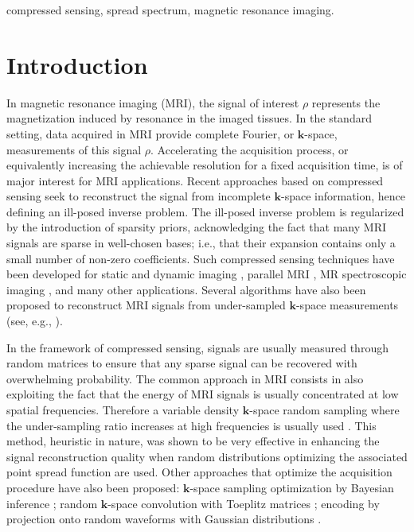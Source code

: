 \documentclass[10pt,draftcls, onecolumn]{IEEEtran}
\begin{document}
\begin{IEEEkeywords}
compressed sensing, spread spectrum, magnetic resonance imaging.
\end{IEEEkeywords}

\section{Introduction}

In magnetic resonance imaging (MRI), the signal of interest $\rho$ represents the magnetization induced by resonance in the imaged tissues. In the standard setting, data acquired in MRI provide complete Fourier, or $\bm{k}$-space, measurements of this signal $\rho$. Accelerating the acquisition process, or equivalently increasing the achievable resolution for a fixed acquisition time, is of major interest for MRI applications. Recent approaches based on compressed sensing seek to reconstruct the signal from incomplete $\bm{k}$-space information, hence defining an ill-posed inverse problem. The ill-posed inverse problem is regularized by the introduction of sparsity priors, acknowledging the fact that many MRI signals are sparse in well-chosen bases; i.e., that their expansion contains only a small number of non-zero coefficients. Such compressed sensing techniques have been developed for static and dynamic imaging \cite{lustig07, jung07, gamper08, jung09, usman11}, parallel MRI \cite{liang09a, lustig10, otazo10}, MR spectroscopic imaging \cite{hu08, hu10, larson10}, and many other applications. Several algorithms have also been proposed to reconstruct MRI signals from under-sampled $\bm{k}$-space measurements (see, e.g., \cite{kim07, trzasko09, kern11}).

In the framework of compressed sensing, signals are usually measured through random matrices to ensure that any sparse signal can be recovered with overwhelming probability. The common approach in MRI consists in also exploiting the fact that the energy of MRI signals is usually concentrated at low spatial frequencies. Therefore a variable density $\bm{k}$-space random sampling where the under-sampling ratio increases at high frequencies is usually used \cite{lustig07}. This method, heuristic in nature, was shown to be very effective in enhancing the signal reconstruction quality when random distributions optimizing the associated point spread function are used. Other approaches that optimize the acquisition procedure have also been proposed: $\bm{k}$-space sampling optimization by Bayesian inference \cite{seeger10}; random $\bm{k}$-space convolution with Toeplitz matrices \cite{sebert08, liang09b, wang09}; encoding by projection onto random waveforms with Gaussian distributions \cite{haldar10}.
\end{document}
